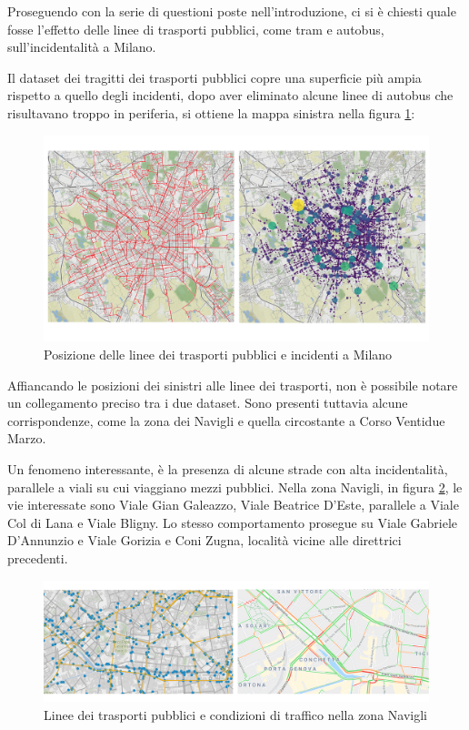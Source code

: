 \documentclass[a4paper]{report}
\begin{document}
Proseguendo con la serie di questioni poste nell'introduzione, ci si è chiesti quale 
fosse l'effetto delle linee di trasporti pubblici, come tram e autobus, 
sull'incidentalità a Milano. 

Il dataset dei tragitti dei trasporti pubblici copre una superficie più ampia rispetto a 
quello degli incidenti, dopo aver eliminato alcune linee di autobus che risultavano 
troppo in periferia, si ottiene la mappa sinistra nella figura \ref{fig:geo-trasporti}: 

\begin{figure}
    \includegraphics[width=\linewidth]{../src/atm/linee_atm.png}
    \caption{Posizione delle linee dei trasporti pubblici e incidenti a Milano}
    \label{fig:geo-trasporti}
\end{figure}

Affiancando le posizioni dei sinistri alle linee dei trasporti, 
non è possibile notare un collegamento preciso tra i due dataset. 
Sono presenti tuttavia alcune corrispondenze, come la zona dei Navigli 
e quella circostante a Corso Ventidue Marzo. 

Un fenomeno interessante, è la presenza di alcune strade con alta incidentalità, 
parallele a viali su cui viaggiano mezzi pubblici. 
Nella zona Navigli, in figura \ref{fig:navigli}, le vie 
interessate sono Viale Gian Galeazzo, Viale Beatrice D'Este, 
parallele a Viale Col di Lana e Viale Bligny. 
Lo stesso comportamento prosegue su Viale Gabriele D'Annunzio e Viale Gorizia e Coni Zugna, 
località vicine alle direttrici precedenti. 

\begin{figure}
    \includegraphics[width=\linewidth]{../src/atm/navigli.png}
    \caption{Linee dei trasporti pubblici e condizioni di traffico nella zona Navigli}
    \label{fig:navigli}
\end{figure}
\end{document}
